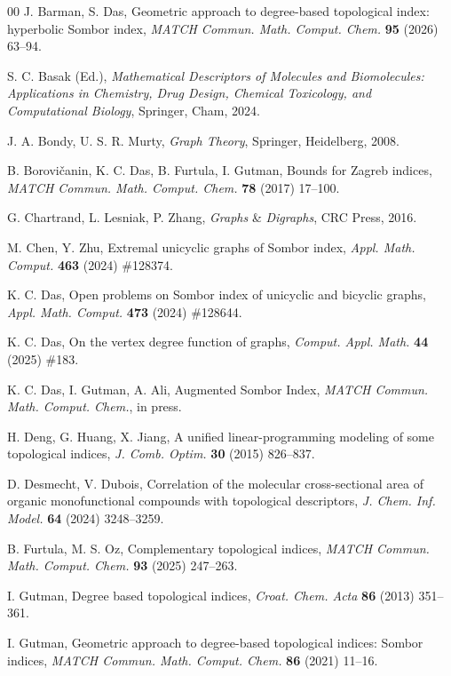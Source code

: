 \documentclass[12pt,a4paper]{article}
\begin{document}
\begin{thebibliography}{00}
 J. Barman, S. Das, Geometric approach to degree-based topological index: hyperbolic Sombor index, {\it MATCH Commun. Math. Comput. Chem.} {\bf95} (2026) 63--94.


 S. C. Basak (Ed.),
{\it Mathematical Descriptors of Molecules and Biomolecules:
Applications in Chemistry, Drug Design, Chemical Toxicology, and Computational Biology}, Springer, Cham, 2024.



 J. A. Bondy, U. S. R. Murty, {\it Graph Theory}, Springer, Heidelberg, 2008.


 B. Borovi\v{c}anin, K. C. Das, B. Furtula, I. Gutman, Bounds for Zagreb indices, {\it MATCH Commun. Math. Comput. Chem.\/} {\bf 78} (2017) 17--100.


 G. Chartrand, L. Lesniak, P. Zhang, {\it Graphs} \& {\it Digraphs}, CRC Press, 2016.



 M. Chen, Y. Zhu, Extremal unicyclic graphs of Sombor index, {\it Appl. Math. Comput.\/} {\bf 463} (2024) \#128374.


 K. C. Das, Open problems on Sombor index of unicyclic and bicyclic graphs,
        {\it Appl. Math. Comput.\/} {\bf 473} (2024) \#128644.

 K. C. Das, On the vertex degree function of graphs, {\it Comput. Appl. Math.\/} {\bf 44} (2025) \#183.


 K. C. Das, I. Gutman, A. Ali, Augmented Sombor Index, {\it MATCH Commun. Math. Comput. Chem.\/}, in press.

 H. Deng, G. Huang, X. Jiang, A unified linear-programming modeling of some topological indices, {\it J. Comb. Optim.} {\bf30} (2015) 826--837.

 D. Desmecht, V. Dubois, Correlation of the molecular cross-sectional area of organic monofunctional compounds with topological descriptors, {\it J. Chem. Inf. Model.} {\bf64} (2024) 3248--3259.

 B. Furtula, M. S. Oz, Complementary topological indices, {\it MATCH Commun. Math. Comput. Chem.} {\bf93} (2025) 247--263.


 I. Gutman, Degree based topological indices, {\it Croat. Chem. Acta\/} {\bf 86} (2013) 351--361.

I. Gutman, Geometric approach to degree-based topological indices: Sombor indices, {\it MATCH Commun. Math. Comput. Chem.\/} {\bf 86} (2021) 11--16.


\end{thebibliography}
\end{document}
